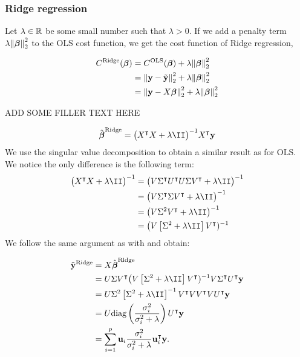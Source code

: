\subsubsection{Ridge regression}\label{sec:Ridge}

Let $\lambda \in \mathbb{R}^{}$ be some small number such that $\lambda >0$. If we add a penalty term $\lambda \norm{\boldsymbol{\beta}}_2^2$ to the OLS cost function, we get the cost function of Ridge regression,

\begin{align*}
    C^\text{Ridge}(\boldsymbol{\beta}) &=  C^\text{OLS}(\boldsymbol{\beta}) + \lambda \norm{\boldsymbol{\beta}}_2^2 \\
    &=\norm{\mathbf{y}-\tilde{\mathbf{y}}}_2^{2}  + \lambda \norm{\boldsymbol{\beta}}_2^2 \\
    &= \norm{\mathbf{y}-X\boldsymbol{\beta}}_2^{2} + \lambda \norm{\boldsymbol{\beta}}_2^2 
\end{align*}

ADD SOME FILLER TEXT HERE

\begin{align*}
    \optbeta^\text{Ridge} = \big(\hessian + \lambda \II\big)^{-1} X\TT\vec{y}
\end{align*}
We use the singular value decomposition to obtain a similar result as for OLS. We notice the only difference is the following term:
\begin{align*}
    \big(\hessian + \lambda\II\big)^{-1} &= \big(V\ST\UT U\S\VT + \lambda\II\big)^{-1}\\
    &= \big(V\ST\S\VT + \lambda\II\big)^{-1} \\
    &=\big(V\S^2\VT + \lambda\II\big)^{-1} \\
    &= \big(V\left[\S^2+\lambda\II\right]\VT)^{-1}
\end{align*}
We follow the same argument as with  and obtain:

\begin{align}\label{eq:ridge_svd}
    \tilde{\vec{y}}^{\text{Ridge}} &=X\optbeta^{\text{Ridge}} \nonumber \\
    &= U\S\VT \big(V\left[\S^2+\lambda\II\right]\VT)^{-1} V\ST\UT\vec{y}\nonumber  \\
    &= U\S^2\left[\S^2+\lambda\II\right]^{-1} \VT V\VT V\UT\vec{y}\nonumber  \\
    &= U\text{diag}\left(\frac{\sigma_i^2}{\sigma_i^2+\lambda}\right)\UT\vec{y} \nonumber \\
    &= \sum_{i=1}^p\vec{u}_i\frac{\sigma_i^2}{\sigma_i^2+\lambda}\vec{u}\TT_i\vec{y}.
\end{align}

